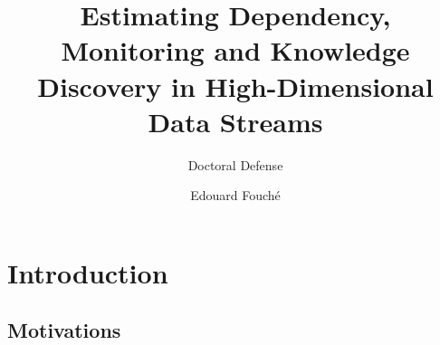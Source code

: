 \documentclass[16pt,usenames,dvipsnames, notheorems]{beamer}
\title[Estimating Dependency, Monitoring and Knowledge Discovery in HD-DS]{\large Estimating Dependency, Monitoring and Knowledge Discovery in High-Dimensional Data Streams}
\subtitle{Doctoral Defense}
\author{Edouard Fouché}
\institute{Advisor: Prof. Dr.-Ing. Klemens Böhm}
\theoremstyle{definition}
\theoremstyle{example}
\theoremstyle{plain}
\begin{document}

\begin{frame}
\titlepage
\end{frame}

\section{Introduction}
\subsection{Motivations}
\end{document}
